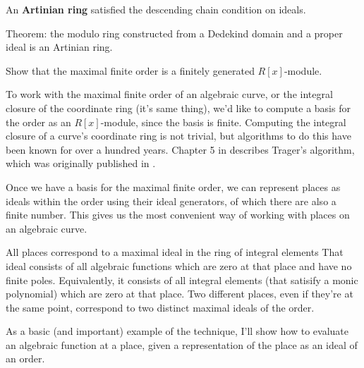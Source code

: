 An {\bf Artinian ring} satisfied the descending chain condition on ideals.

Theorem: the modulo ring constructed from a Dedekind domain and a proper ideal is an Artinian ring.

Show that the maximal finite order is a finitely generated $R[x]$-module.

To work with the maximal finite order of an algebraic curve, or the integral closure of the coordinate
ring (it's same thing), we'd like to compute a basis for the order as an $R[x]$-module, since
the basis is finite.  Computing the integral closure of a curve's coordinate ring is not
trivial, but algorithms to do this have been known for over a hundred years.  Chapter 5
in \cite{alvanos} describes Trager's algorithm, which was originally published
in \cite{trager}.

Once we have a basis for the maximal finite order, we can represent places as ideals within the order
using their ideal generators, of which there are also a finite number.  This gives us the most convenient
way of working with places on an algebraic curve.

All places correspond to a maximal ideal in the ring of integral elements
That ideal consists of all algebraic functions which are zero at that place and have no finite poles.
Equivalently, it consists of all integral elements (that satisify a monic polynomial) which are
zero at that place.
Two different places, even if they're at the same point, correspond to two distinct maximal ideals of the order.

As a basic (and important) example of the technique, I'll show how to evaluate an algebraic function
at a place, given a representation of the place as an ideal of an order.

